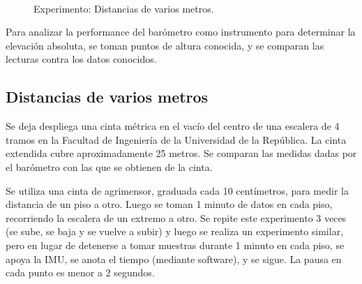 \documentclass[main]{subfiles}
\begin{document}
\begin{figure}
\vspace{-70pt}
  \begin{center}
	\\
  \end{center}
  \caption{Experimento: Distancias de varios metros.}
\label{fig:escalera-fing}
\vspace{-40pt}
\end{figure}

Para analizar la performance del barómetro como instrumento para determinar la elevación absoluta, se toman puntos de altura conocida, y se comparan las lecturas contra los datos conocidos.

\subsection{Distancias de varios metros}

Se deja despliega una cinta métrica en el vacío del centro de una escalera de 4 tramos en la Facultad de Ingeniería de la Universidad de la República. La cinta extendida cubre aproximadamente 25 metros. Se comparan las medidas dadas por el barómetro con las que se obtienen de la cinta.

Se utiliza una cinta de agrimensor, graduada cada 10 centímetros, para medir la distancia de un piso a otro. Luego se toman 1 minuto de datos en cada piso, recorriendo la escalera de un extremo a otro. Se repite este experimento 3 veces (se sube, se baja y se vuelve a subir) y luego se realiza un experimento similar, pero en lugar de detenerse a tomar muestras durante 1 minuto en cada piso, se apoya la IMU, se anota el tiempo (mediante software), y se sigue. La pausa en cada punto es menor a 2 segundos.
\end{document}
